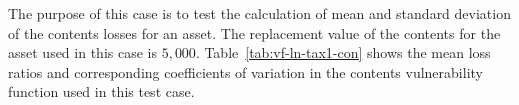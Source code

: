 The purpose of this case is to test the calculation of mean and standard deviation of the contents losses for an asset. The replacement value of the contents for the asset used in this case is $5,000$. Table~\ref{tab:vf-ln-tax1-con} shows the mean loss ratios and corresponding coefficients of variation in the contents vulnerability function used in this test case.

